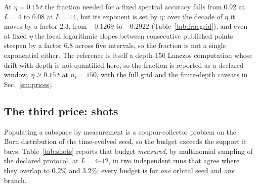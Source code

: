 At $\eta=0.15\,t$ the fraction needed for a fixed spectral accuracy falls from $0.92$ at $L=4$ to
$0.08$ at $L=14$, but its exponent is set by $\eta$: over the decade of $\eta$ it moves by a factor
$2.3$, from $-0.1269$ to $-0.2922$ (Table~\ref{tab:fracgrid}), and even at fixed $\eta$ the local
logarithmic slopes between consecutive published points steepen by a factor $6.8$ across five
intervals, so the fraction is not a single exponential either. The reference is itself a
depth-$150$ Lanczos computation whose drift with depth is not quantified here, so the fraction is reported as a declared window,
$\eta\ge0.15\,t$ at $n_\ell=150$, with the full grid and the finite-depth caveats in
Sec.~\ref{sm:prices}.

\subsection{The third price: shots}

Populating a subspace by measurement is a coupon-collector problem on the Born distribution of the
time-evolved seed, so the budget exceeds the support it buys. Table~\ref{tab:shots} reports that budget
\emph{measured}, by multinomial sampling of the declared protocol, at $L=4$--$12$, in
two independent runs that agree where they overlap to $0.2\%$ and $3.2\%$; every budget is for
\emph{one} orbital seed and \emph{one} branch.

